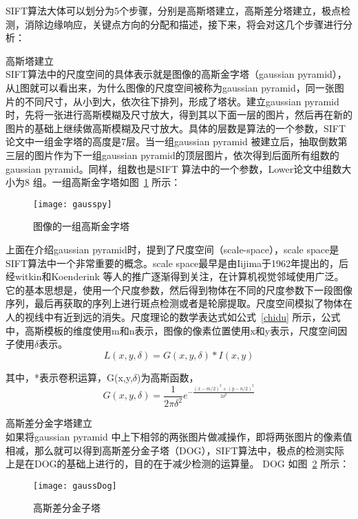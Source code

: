 SIFT算法大体可以划分为5个步骤，分别是高斯塔建立，高斯差分塔建立，极点检测，消除边缘响应，关键点方向的分配和描述，接下来，将会对这几个步骤进行分析：
\begin{compactenum}
\item 高斯塔建立\\SIFT算法中的尺度空间的具体表示就是图像的高斯金字塔（gaussian pyramid），从\ref{fig:gausspy}图就可以看出来，为什么图像的尺度空间被称为gaussian pyramid，同一张图片的不同尺寸，从小到大，依次往下排列，形成了塔状。建立gaussian pyramid时，先将一张进行高斯模糊及尺寸放大，得到其以下面一层的图片，然后再在新的图片的基础上继续做高斯模糊及尺寸放大。具体的层数是算法的一个参数，SIFT论文中一组金字塔的高度是7层。当一组gaussian pyramid 被建立后，抽取倒数第三层的图片作为下一组gaussian pyramid的顶层图片，依次得到后面所有组数的gaussian pyramid。同样，组数也是SIFT 算法中的一个参数，Lower论文中组数大小为8 组。一组高斯金字塔如图~\ref{fig:gausspy} 所示：
\begin{figure}[htp]
\centering
\texttt{[image: gausspy]}
\caption{图像的一组高斯金字塔}
\label{fig:gausspy}
\end{figure}

上面在介绍gaussian pyramid时，提到了尺度空间（scale-space），scale space是SIFT算法中一个非常重要的概念。scale space最早是由Iijima于1962年提出的，后经witkin和Koenderink 等人的推广逐渐得到关注，在计算机视觉邻域使用广泛。它的基本思想是，使用一个尺度参数，然后得到物体在不同的尺度参数下一段图像序列，最后再获取的序列上进行斑点检测或者是轮廓提取。尺度空间模拟了物体在人的视线中有近到远的消失。尺度理论的数学表达式如公式~\ref{chidu} 所示，公式中，高斯模板的维度使用m和n表示，图像的像素位置使用x和y表示，尺度空间因子使用$\delta$表示。
\begin{equation}\label{chidu}
L(x,y,\delta)=G(x,y,\delta)*I(x,y)
\end{equation}

其中，*表示卷积运算，G(x,y,$\delta$)为高斯函数，
\begin{equation}\label{gauss}
G(x,y,\delta)=\frac{1}{2\pi{\delta}^2}e^{-\frac{(x-m/2)^2+(y-n/2)^2}{2\delta^2}}
\end{equation}

\item 高斯差分金字塔建立\\如果将gaussian pyramid 中上下相邻的两张图片做减操作，即将两张图片的像素值相减，那么就可以得到高斯差分金子塔（DOG），SIFT算法中，极点的检测实际上是在DOG的基础上进行的，目的在于减少检测的运算量。 DOG 如图~\ref{fig:gaussDog} 所示：
\begin{figure}[htp]
\centering
\texttt{[image: gaussDog]}
\caption{高斯差分金子塔}
\label{fig:gaussDog}
\end{figure}


\end{compactenum}
